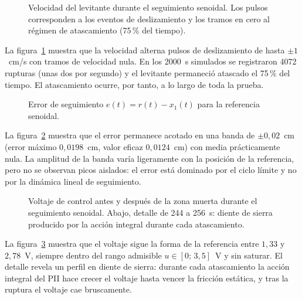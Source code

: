 \FloatBarrier

\begin{figure}[ht]
    \centering
    
    \caption[Seguimiento senoidal: velocidad]{Velocidad del levitante durante el seguimiento senoidal. Los pulsos corresponden a los eventos de deslizamiento y los tramos en cero al régimen de atascamiento (75\,\% del tiempo).}
    \label{fig:sen_vel}
\end{figure}

La figura~\ref{fig:sen_vel} muestra que la velocidad alterna pulsos de deslizamiento de hasta $\pm 1$~cm/s con tramos de velocidad nula. En los 2000~s simulados se registraron 4072 rupturas (unas dos por segundo) y el levitante permaneció atascado el 75\,\% del tiempo. El atascamiento ocurre, por tanto, a lo largo de toda la prueba.

\FloatBarrier

\begin{figure}[ht]
    \centering
    
    \caption[Seguimiento senoidal: error]{Error de seguimiento $e(t)=r(t)-x_1(t)$ para la referencia senoidal.}
    \label{fig:sen_error}
\end{figure}

La figura~\ref{fig:sen_error} muestra que el error permanece acotado en una banda de $\pm 0{,}02$~cm (error máximo $0{,}0198$~cm, valor eficaz $0{,}0124$~cm) con media prácticamente nula. La amplitud de la banda varía ligeramente con la posición de la referencia, pero no se observan picos aislados: el error está dominado por el ciclo límite y no por la dinámica lineal de seguimiento.

\FloatBarrier

\begin{figure}[ht]
    \centering
    
    \caption[Seguimiento senoidal: señal de control]{Voltaje de control antes y después de la zona muerta durante el seguimiento senoidal. Abajo, detalle de 244 a 256~s: diente de sierra producido por la acción integral durante cada atascamiento.}
    \label{fig:sen_ctrl}
\end{figure}

La figura~\ref{fig:sen_ctrl} muestra que el voltaje sigue la forma de la referencia entre $1{,}33$ y $2{,}78$~V, siempre dentro del rango admisible $u \in [0;\,3{,}5]$~V y sin saturar. El detalle revela un perfil en diente de sierra: durante cada atascamiento la acción integral del PII hace crecer el voltaje hasta vencer la fricción estática, y tras la ruptura el voltaje cae bruscamente.

